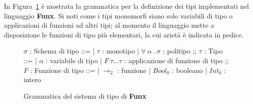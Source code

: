\noindent In Figura~\ref{fig:3-system-hm} è mostrata la grammatica per la definizione dei tipi
implementati nel linguaggio \textbf{Funx}. Si noti come i tipi monomorfi siano solo
variabili di tipo o applicazioni di funzioni ad altri tipi; al momento il linguaggio mette a disposizione
le funzioni di tipo più elementari, la cui arietà è indicata in pedice.

\begin{figure}
    \vspace{4mm}
    \begin{bnf}
        $\sigma$ : \small{Schema di tipo} ::=
        | $\tau$ : \small{monotipo}
        | $\forall\ \alpha\ .\ \sigma$ : \small{politipo}
        ;;
        $\tau$ : \small{Tipo} ::=
        | $\alpha$ : \small{variabile di tipo}
        | $F\ \tau\ldots\tau$ : \small{applicazione di funzione di tipo}
        ;;
        $F$ : \small{Funzione di tipo} ::=
        | $\rightarrow_2$ : \small{funzione}
        | $Bool_0$ : \small{booleano}
        | $Int_0$ : \small{intero}
    \end{bnf}
    \caption{Grammatica del sistema di tipo di \textbf{Funx}}
    \label{fig:3-system-hm}
    \vspace{4mm}
\end{figure}